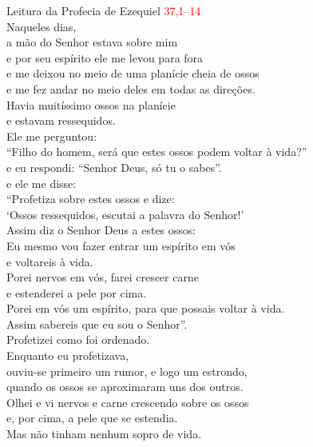 \documentclass{book}
\begin{document}
\begin{flushleft}

    \vspace{.2cm}
    Leitura da Profecia de Ezequiel
    \hspace{\fill}
    \textcolor{red}{37,1--14}
    \vspace{.2cm} \\
    Naqueles dias, \\
    a mão do Senhor estava sobre mim \\
    e por seu espírito ele me levou para fora \\
    e me deixou no meio de uma planície cheia de ossos \\
    e me fez andar no meio deles em todas as direções. \\
    Havia muitíssimo ossos na planície \\
    e estavam ressequidos. \\
    Ele me perguntou: \\
    ``Filho do homem, será que estes ossos podem voltar à vida?'' \\
    e eu respondi: ``Senhor Deus, só tu o sabes''. \\
    e ele me disse: \\
    ``Profetiza sobre estes ossos e dize: \\
    `Ossos ressequidos, escutai a palavra do Senhor!' \\
    Assim diz o Senhor Deus a estes ossos: \\
    Eu mesmo vou fazer entrar um espírito em vós \\
    e voltareis à vida. \\
    Porei nervos em vós, farei crescer carne \\
    e estenderei a pele por cima. \\
    Porei em vós um espírito, para que possais voltar à vida. \\
    Assim sabereis que eu sou o Senhor''. \\
    Profetizei como foi ordenado. \\
    Enquanto eu profetizava, \\
    ouviu-se primeiro um rumor, e logo um estrondo, \\
    quando os ossos se aproximaram uns dos outros. \\
    Olhei e vi nervos e carne crescendo sobre os ossos \\
    e, por cima, a pele que se estendia. \\
    Mas não tinham nenhum sopro de vida. \\

\end{flushleft}
\end{document}
